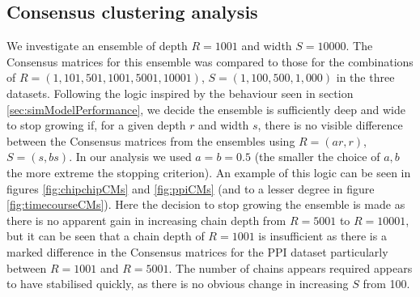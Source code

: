 \documentclass[]{article}
\begin{document}

\subsection{Consensus clustering analysis} \label{sec:consensusClustering}
We investigate an ensemble of depth $R=1001$ and width $S=10000$. The Consensus matrices for this ensemble was compared to those for the combinations of $R = (1, 101, 501, 1001, 5001, 10001)$, $S=(1, 100, 500, 1,000)$ in the three datasets. Following the logic inspired by the behaviour seen in section \ref{sec:simModelPerformance}, we decide the ensemble is sufficiently deep and wide to stop growing if,  for a given depth $r$ and width $s$, there is no visible difference between the Consensus matrices from the ensembles using $R=(a r, r)$, $S=(s, b s)$. In our analysis we used $a=b=0.5$ (the smaller the choice of $a,b$ the more extreme the stopping criterion). An example of this logic can be seen in figures \ref{fig:chipchipCMs} and \ref{fig:ppiCMs} (and to a lesser degree in figure \ref{fig:timecourseCMs}). Here the decision to stop growing the ensemble is made as there is no apparent gain in increasing chain depth from $R=5001$ to $R=10001$, but it can be seen that a chain depth of $R=1001$ is insufficient as there is a marked difference in the Consensus matrices for the PPI dataset particularly between $R=1001$ and $R=5001$. The number of chains appears required appears to have stabilised quickly, as there is no obvious change in increasing $S$ from 100.
\end{document}
